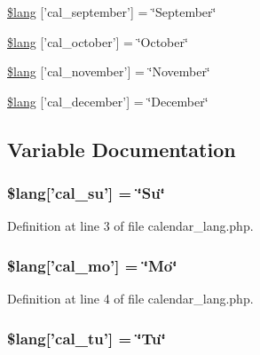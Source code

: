 \begin{DoxyCompactItemize}
\item 
\hyperlink{calendar__lang_8php_a7223c2b685dfa0a6e9a9ebec0e9e912b}{\$lang} \mbox{[}'cal\-\_\-september'\mbox{]} = \char`\"{}September\char`\"{}
\item 
\hyperlink{calendar__lang_8php_af49c3d53649acdf354e7cf9a210f7aa0}{\$lang} \mbox{[}'cal\-\_\-october'\mbox{]} = \char`\"{}October\char`\"{}
\item 
\hyperlink{calendar__lang_8php_aa05ad18c3c08c3184efd08188bdc2c56}{\$lang} \mbox{[}'cal\-\_\-november'\mbox{]} = \char`\"{}November\char`\"{}
\item 
\hyperlink{calendar__lang_8php_ac4bbc26ddae9900021fe967b02bc7a6c}{\$lang} \mbox{[}'cal\-\_\-december'\mbox{]} = \char`\"{}December\char`\"{}
\end{DoxyCompactItemize}


\subsection{Variable Documentation}
\hypertarget{calendar__lang_8php_a120ec4cf98cb46665da894790bf9d68b}{
\subsubsection[{\$lang}]{\setlength{\rightskip}{0pt plus 5cm}\$lang\mbox{[}'cal\-\_\-su'\mbox{]} = \char`\"{}Su\char`\"{}}}\label{calendar__lang_8php_a120ec4cf98cb46665da894790bf9d68b}


Definition at line 3 of file calendar\-\_\-lang.\-php.

\hypertarget{calendar__lang_8php_addb07b314f8ffca137dd372ffccc0086}{
\subsubsection[{\$lang}]{\setlength{\rightskip}{0pt plus 5cm}\$lang\mbox{[}'cal\-\_\-mo'\mbox{]} = \char`\"{}Mo\char`\"{}}}\label{calendar__lang_8php_addb07b314f8ffca137dd372ffccc0086}


Definition at line 4 of file calendar\-\_\-lang.\-php.

\hypertarget{calendar__lang_8php_ae6d1a5da4eaa6f0ea7b90c1f1f8c5d58}{
\subsubsection[{\$lang}]{\setlength{\rightskip}{0pt plus 5cm}\$lang\mbox{[}'cal\-\_\-tu'\mbox{]} = \char`\"{}Tu\char`\"{}}}\label{calendar__lang_8php_ae6d1a5da4eaa6f0ea7b90c1f1f8c5d58}


